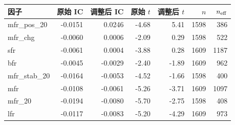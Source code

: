 {\small
\begin{longtable}{@{}lrrrrrr@{}}
\toprule
因子 & 原始 IC & 调整后 IC & 原始 $t$ & 调整后 $t$ & $n$ & $n_{\rm eff}$ \\
\midrule
\endhead
mfr\_pos\_20 & -0.0151 & 0.0246 & -4.68 & 5.41 & 1598 & 386 \\
mfr\_chg & -0.0060 & 0.0006 & -2.09 & 0.29 & 1598 & 522 \\
sfr & -0.0061 & 0.0004 & -3.88 & 0.28 & 1609 & 1187 \\
bfr & -0.0045 & -0.0029 & -2.40 & -1.89 & 1609 & 962 \\
mfr\_stab\_20 & -0.0164 & -0.0053 & -4.52 & -1.66 & 1598 & 400 \\
mfr & -0.0108 & -0.0061 & -5.26 & -3.71 & 1609 & 1097 \\
mfr\_20 & -0.0194 & -0.0080 & -5.70 & -2.75 & 1598 & 408 \\
lfr & -0.0117 & -0.0083 & -5.20 & -4.29 & 1609 & 973 \\
\bottomrule
\end{longtable}
}
